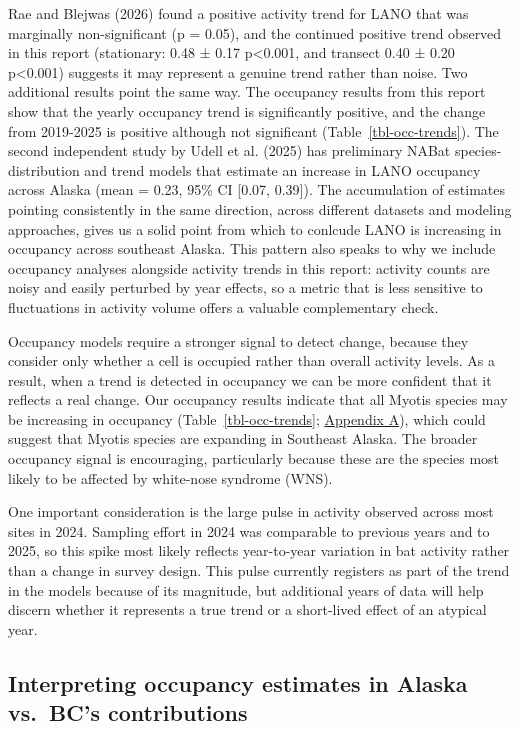\documentclass[
  letterpaper,
  DIV=11,
  numbers=noendperiod]{scrartcl}
\begin{document}
Rae and Blejwas (2026) found a positive activity trend for LANO that was
marginally non-significant (p = 0.05), and the continued positive trend
observed in this report (stationary: 0.48 ± 0.17 p\textless0.001, and
transect 0.40 ± 0.20 p\textless0.001) suggests it may represent a
genuine trend rather than noise. Two additional results point the same
way. The occupancy results from this report show that the yearly
occupancy trend is significantly positive, and the change from 2019-2025
is positive although not significant (Table~\ref{tbl-occ-trends}). The
second independent study by Udell et al. (2025) has preliminary NABat
species-distribution and trend models that estimate an increase in LANO
occupancy across Alaska (mean = 0.23, 95\% CI {[}0.07, 0.39{]}). The
accumulation of estimates pointing consistently in the same direction,
across different datasets and modeling approaches, gives us a solid
point from which to conlcude LANO is increasing in occupancy across
southeast Alaska. This pattern also speaks to why we include occupancy
analyses alongside activity trends in this report: activity counts are
noisy and easily perturbed by year effects, so a metric that is less
sensitive to fluctuations in activity volume offers a valuable
complementary check.

Occupancy models require a stronger signal to detect change, because
they consider only whether a cell is occupied rather than overall
activity levels. As a result, when a trend is detected in occupancy we
can be more confident that it reflects a real change. Our occupancy
results indicate that all Myotis species may be increasing in occupancy
(Table~\ref{tbl-occ-trends}; \hyperref[sec-appendix-a]{Appendix A}),
which could suggest that Myotis species are expanding in Southeast
Alaska. The broader occupancy signal is encouraging, particularly
because these are the species most likely to be affected by white-nose
syndrome (WNS).

One important consideration is the large pulse in activity observed
across most sites in 2024. Sampling effort in 2024 was comparable to
previous years and to 2025, so this spike most likely reflects
year-to-year variation in bat activity rather than a change in survey
design. This pulse currently registers as part of the trend in the
models because of its magnitude, but additional years of data will help
discern whether it represents a true trend or a short-lived effect of an
atypical year.

\subsection{Interpreting occupancy estimates in Alaska vs.~BC's
contributions}\label{interpreting-occupancy-estimates-in-alaska-vs.-bcs-contributions}
\end{document}
